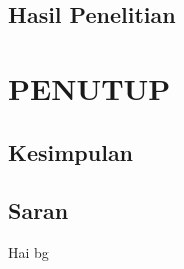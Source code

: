 \documentclass{file/KP-ITS}
\theoremstyle{definition}
\theoremstyle{definition}
\theoremstyle{plain}
\begin{document}
\section{Hasil Penelitian}


\chapter{PENUTUP}

\section{Kesimpulan}
\section{Saran}


\pagebreak
\DaftarPustaka

\pagebreak
{}

\pagebreak
{}
Hai bg
\end{document}
